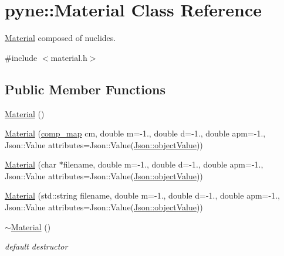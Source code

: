\hypertarget{classpyne_1_1_material}{}\section{pyne\+:\+:Material Class Reference}
\label{classpyne_1_1_material}


\hyperlink{classpyne_1_1_material}{Material} composed of nuclides.  




{\ttfamily \#include $<$material.\+h$>$}

\subsection*{Public Member Functions}
\begin{DoxyCompactItemize}
\item 
\hyperlink{classpyne_1_1_material_af9ff0462388696834a886b2e284ccd4e}{Material} ()
\item 
\hyperlink{classpyne_1_1_material_a0704a8fc8a7599cb271c349240f37538}{Material} (\hyperlink{namespacepyne_a86738cecccf4ce3f4ecc2ff6f45ce1a2}{comp\+\_\+map} cm, double m=-\/1., double d=-\/1., double apm=-\/1., Json\+::\+Value attributes=Json\+::\+Value(\hyperlink{namespace_json_a7d654b75c16a57007925868e38212b4eae8386dcfc36d1ae897745f7b4f77a1f6}{Json\+::object\+Value}))
\item 
\hyperlink{classpyne_1_1_material_a9119502ada318009bebedfb429d534d6}{Material} (char $\ast$filename, double m=-\/1., double d=-\/1., double apm=-\/1., Json\+::\+Value attributes=Json\+::\+Value(\hyperlink{namespace_json_a7d654b75c16a57007925868e38212b4eae8386dcfc36d1ae897745f7b4f77a1f6}{Json\+::object\+Value}))
\item 
\hyperlink{classpyne_1_1_material_ad8f2148f252f71de8f699d58003ca050}{Material} (std\+::string filename, double m=-\/1., double d=-\/1., double apm=-\/1., Json\+::\+Value attributes=Json\+::\+Value(\hyperlink{namespace_json_a7d654b75c16a57007925868e38212b4eae8386dcfc36d1ae897745f7b4f77a1f6}{Json\+::object\+Value}))
\item 
\mbox{\label{classpyne_1_1_material_ae75f45397f12797356940e62d13fcc6f}} 
\hyperlink{classpyne_1_1_material_ae75f45397f12797356940e62d13fcc6f}{$\sim$\+Material} ()
\begin{DoxyCompactList}\small\item\em default destructor \end{DoxyCompactList}\item 

\end{DoxyCompactItemize}
